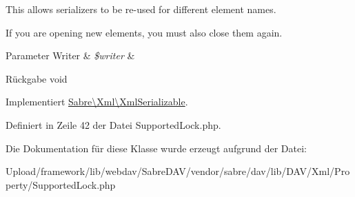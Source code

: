 This allows serializers to be re-\/used for different element names.

If you are opening new elements, you must also close them again.


\begin{DoxyParams}[1]{Parameter}
Writer & {\em \$writer} & \\
\hline
\end{DoxyParams}
\begin{DoxyReturn}{Rückgabe}
void 
\end{DoxyReturn}


Implementiert \mbox{\hyperlink{interface_sabre_1_1_xml_1_1_xml_serializable_aa78f3ee43aa699be8347181653a53d8c}{Sabre\textbackslash{}\+Xml\textbackslash{}\+Xml\+Serializable}}.



Definiert in Zeile 42 der Datei Supported\+Lock.\+php.



Die Dokumentation für diese Klasse wurde erzeugt aufgrund der Datei\+:\begin{DoxyCompactItemize}
\item 
Upload/framework/lib/webdav/\+Sabre\+D\+A\+V/vendor/sabre/dav/lib/\+D\+A\+V/\+Xml/\+Property/Supported\+Lock.\+php\end{DoxyCompactItemize}

